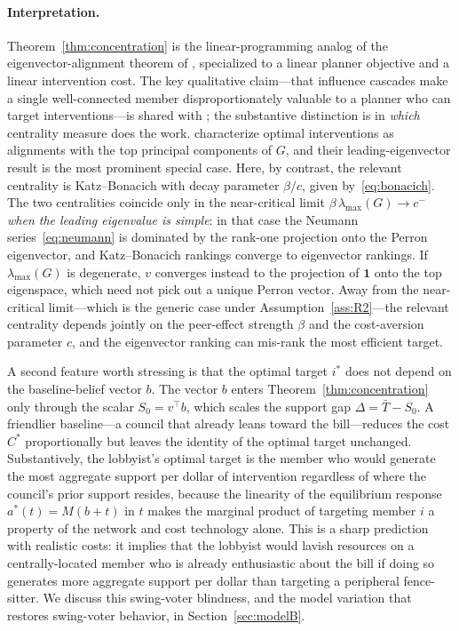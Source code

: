 \documentclass[11pt,letterpaper]{article}
\theoremstyle{plain}
\theoremstyle{definition}
\theoremstyle{remark}
\begin{document}
\paragraph{Interpretation.} Theorem~\ref{thm:concentration} is the linear-programming analog of the eigenvector-alignment theorem of \citet{ggg2020}, specialized to a linear planner objective and a linear intervention cost. The key qualitative claim---that influence cascades make a single well-connected member disproportionately valuable to a planner who can target interventions---is shared with \citet{ggg2020}; the substantive distinction is in \emph{which} centrality measure does the work. \citet{ggg2020} characterize optimal interventions as alignments with the top principal components of $G$, and their leading-eigenvector result is the most prominent special case. Here, by contrast, the relevant centrality is Katz--Bonacich with decay parameter $\beta/c$, given by~\eqref{eq:bonacich}. The two centralities coincide only in the near-critical limit $\beta\,\lambda_{\max}(G) \to c^-$ \emph{when the leading eigenvalue is simple}: in that case the Neumann series~\eqref{eq:neumann} is dominated by the rank-one projection onto the Perron eigenvector, and Katz--Bonacich rankings converge to eigenvector rankings. If $\lambda_{\max}(G)$ is degenerate, $v$ converges instead to the projection of $\mathbf{1}$ onto the top eigenspace, which need not pick out a unique Perron vector. Away from the near-critical limit---which is the generic case under Assumption~\ref{ass:R2}---the relevant centrality depends jointly on the peer-effect strength $\beta$ and the cost-aversion parameter $c$, and the eigenvector ranking can mis-rank the most efficient target.

A second feature worth stressing is that the optimal target $i^*$ does not depend on the baseline-belief vector $b$. The vector $b$ enters Theorem~\ref{thm:concentration} only through the scalar $S_0 = v^\top b$, which scales the support gap $\Delta = \bar T - S_0$. A friendlier baseline---a council that already leans toward the bill---reduces the cost $C^*$ proportionally but leaves the identity of the optimal target unchanged. Substantively, the lobbyist's optimal target is the member who would generate the most aggregate support per dollar of intervention regardless of where the council's prior support resides, because the linearity of the equilibrium response $a^*(t) = M(b+t)$ in $t$ makes the marginal product of targeting member $i$ a property of the network and cost technology alone. This is a sharp prediction with realistic costs: it implies that the lobbyist would lavish resources on a centrally-located member who is already enthusiastic about the bill if doing so generates more aggregate support per dollar than targeting a peripheral fence-sitter. We discuss this swing-voter blindness, and the model variation that restores swing-voter behavior, in Section~\ref{sec:modelB}.
\end{document}
